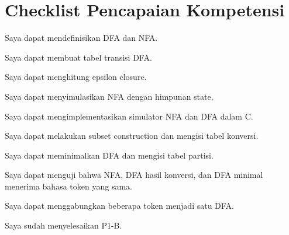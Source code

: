 \section*{Checklist Pencapaian Kompetensi}

\begin{checklist}
  \item Saya dapat mendefinisikan DFA dan NFA.
  \item Saya dapat membuat tabel transisi DFA.
  \item Saya dapat menghitung epsilon closure.
  \item Saya dapat menyimulasikan NFA dengan himpunan state.
  \item Saya dapat mengimplementasikan simulator NFA dan DFA dalam C.
  \item Saya dapat melakukan subset construction dan mengisi tabel
        konversi.
  \item Saya dapat meminimalkan DFA dan mengisi tabel partisi.
  \item Saya dapat menguji bahwa NFA, DFA hasil konversi, dan DFA
        minimal menerima bahasa token yang sama.
  \item Saya dapat menggabungkan beberapa token menjadi satu DFA.
  \item Saya sudah menyelesaikan P1-B.
\end{checklist}
